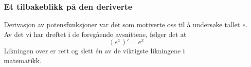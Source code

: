 \subsubsection{Et tilbakeblikk på den deriverte}
Derivasjon av potensfunksjoner var det som motiverte oss til å undersøke tallet $ e $. Av det vi har drøftet i de foregående avsnittene, følger det at
\[ \left(e^x\right)'=e^x \]
Likningen over er rett og slett én av de viktigste likningene i\\
matematikk.
